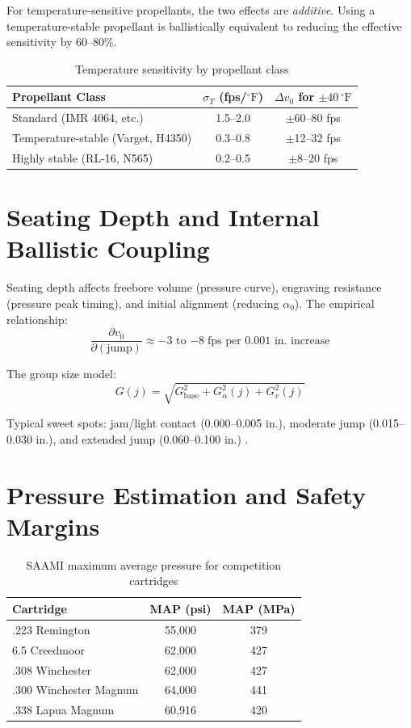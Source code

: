 \documentclass[11pt,twoside,openright]{report}
\newcommand{\degF}{{}^{\circ}\mathrm{F}}
\begin{document}
For temperature-sensitive propellants, the two effects are \emph{additive}. Using a temperature-stable propellant is ballistically equivalent to reducing the effective sensitivity by 60--80\%.

\begin{table}[H]
\centering
\caption{Temperature sensitivity by propellant class}
\label{tab:propellant_temp}
\begin{tabular}{@{}lcc@{}}
\toprule
\textbf{Propellant Class} & $\sigma_T$ \textbf{(fps/$\degF$)} & $\Delta v_0$ \textbf{for $\pm 40\,\degF$} \\
\midrule
Standard (IMR 4064, etc.) & 1.5--2.0 & $\pm$60--80 fps \\
Temperature-stable (Varget, H4350) & 0.3--0.8 & $\pm$12--32 fps \\
Highly stable (RL-16, N565) & 0.2--0.5 & $\pm$8--20 fps \\
\bottomrule
\end{tabular}
\end{table}

\section{Seating Depth and Internal Ballistic Coupling}

Seating depth affects freebore volume (pressure curve), engraving resistance (pressure peak timing), and initial alignment (reducing $\alpha_0$). The empirical relationship:
\begin{equation}
  \frac{\partial v_0}{\partial (\text{jump})} \approx -3 \text{ to } {-8}\;\text{fps per 0.001 in.\ increase}
  \label{eq:jump_vel}
\end{equation}

The group size model:
\begin{equation}
  G(j) = \sqrt{G_{\mathrm{base}}^2 + G_{\alpha}^2(j) + G_v^2(j)}
  \label{eq:group_model}
\end{equation}

Typical sweet spots: jam/light contact (0.000--0.005 in.), moderate jump (0.015--0.030 in.), and extended jump (0.060--0.100 in.) \citep{litz2011applied}.

\section{Pressure Estimation and Safety Margins}

\begin{table}[H]
\centering
\caption{SAAMI maximum average pressure for competition cartridges}
\label{tab:saami_map}
\begin{tabular}{@{}lcc@{}}
\toprule
\textbf{Cartridge} & \textbf{MAP (psi)} & \textbf{MAP (MPa)} \\
\midrule
.223 Remington & 55,000 & 379 \\
6.5 Creedmoor & 62,000 & 427 \\
.308 Winchester & 62,000 & 427 \\
.300 Winchester Magnum & 64,000 & 441 \\
.338 Lapua Magnum & 60,916 & 420 \\
\bottomrule
\end{tabular}
\end{table}
\end{document}

